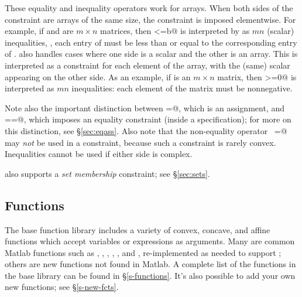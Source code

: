 \documentclass[12pt]{article}
\begin{document}
These equality and inequality operators work for arrays.
When both sides of the constraint are arrays of the same size,
the constraint is imposed elementwise. For example, if \verb@a@ and \verb@b@
are $m \times n$ matrices, then \verb@a<=b@
is interpreted by \cvx as $mn$ (scalar) inequalities, \ie,
each entry of \verb@a@ must be less than or equal to
the corresponding entry of \verb@b@.
\cvx also handles cases where one side is 
a scalar and the other is an array.  This is interpreted as a
constraint for each element of the array, with the (same) scalar
appearing on the other side.
As an example, if \verb@a@ is an $m\times n$ matrix, then \verb@a>=0@ 
is interpreted as $mn$ inequalities: each element of the matrix
must be nonnegative.

Note also the important distinction between \verb@=@, which is an 
assignment, and \verb@==@, which imposes an equality constraint
(inside a \cvx specification); for more on this distinction,
see \S\ref{sec:eqass}.
Also note that the non-equality operator \verb@~=@ may \emph{not}
be used in a constraint, because such a constraint is rarely convex.
Inequalities cannot be used if either side is complex.

\cvx also supports a \emph{set membership} constraint; 
see \S\ref{sec:sets}.

\subsection{Functions}

The base \cvx function library
includes a variety of convex, concave, and affine functions
which accept \cvx variables or expressions as arguments.
Many are common Matlab functions
such as \verb@sum@, \verb@trace@, \verb@diag@, \verb@sqrt@,
\verb@max@, and \verb@min@,
re-implemented as needed to support \cvx; others are new
functions not found in Matlab.
A complete list of the functions in the base library 
can be found in \S\ref{s-functions}.
It's also possible to add your own new functions;
see \S\ref{s-new-fcts}.
\end{document}
